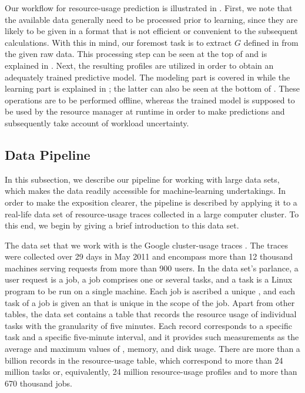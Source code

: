 Our workflow for resource-usage prediction is illustrated in
. First, we note that the available data generally need to
be processed prior to learning, since they are likely to be given in a format
that is not efficient or convenient to the subsequent calculations. With this in
mind, our foremost task is to extract $G$ defined in  from
the given raw data. This processing step can be seen at the top of
 and is explained in . Next, the
resulting profiles are utilized in order to obtain an adequately trained
predictive model. The modeling part is covered in 
while the learning part is explained in ; the
latter can also be seen at the bottom of . These operations
are to be performed offline, whereas the trained model is supposed to be used by
the resource manager at runtime in order to make predictions and subsequently
take account of workload uncertainty.

\subsection{Data Pipeline}

In this subsection, we describe our pipeline for working with large data sets,
which makes the data readily accessible for machine-learning undertakings. In
order to make the exposition clearer, the pipeline is described by applying it
to a real-life data set of resource-usage traces collected in a large computer
cluster. To this end, we begin by giving a brief introduction to this data set.

The data set that we work with is the Google cluster-usage traces
\cite{reiss2011}. The traces were collected over 29 days in May 2011 and
encompass more than 12 thousand machines serving requests from more than 900
users. In the data set's parlance, a user request is a job, a job comprises one
or several tasks, and a task is a Linux program to be run on a single machine.
Each job is ascribed a unique , and each task of a job is given an
 that is unique in the scope of the job. Apart from other tables, the
data set contains a table that records the resource usage of individual tasks
with the granularity of five minutes. Each record corresponds to a specific task
and a specific five-minute interval, and it provides such measurements as the
average and maximum values of , memory, and disk usage. There are more
than a billion records in the resource-usage table, which correspond to more
than 24 million tasks or, equivalently, 24 million resource-usage profiles and
to more than 670 thousand jobs.

